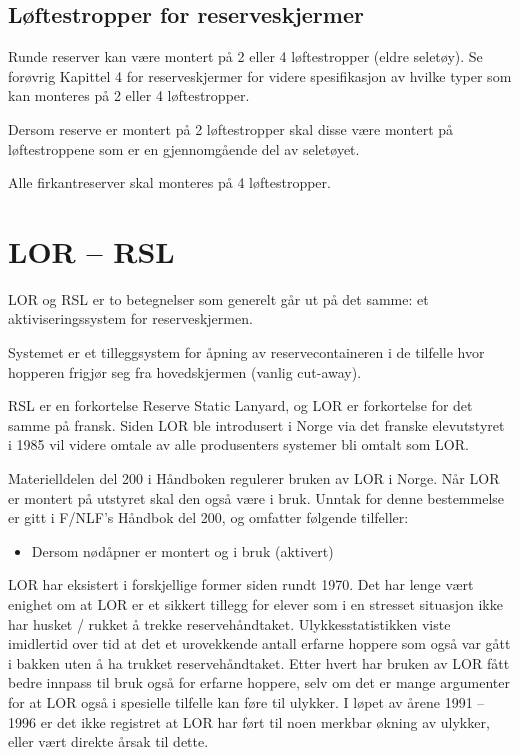 \subsection{Løftestropper for reserveskjermer}
Runde reserver kan være montert på 2 eller 4 løftestropper (eldre seletøy). Se forøvrig Kapittel 4 for reserveskjermer for videre spesifikasjon av hvilke typer som kan monteres på 2 eller 4 løftestropper.

Dersom reserve er montert på 2 løftestropper skal disse være montert på løftestroppene som er en gjennomgående del av seletøyet.

Alle firkantreserver skal monteres på 4 løftestropper.

\section{LOR – RSL}
LOR og RSL er to betegnelser som generelt går ut på det samme: et aktiviseringssystem for reserveskjermen.

Systemet er et tilleggsystem for åpning av reservecontaineren i de tilfelle hvor hopperen frigjør seg fra hovedskjermen (vanlig cut-away).

RSL er en forkortelse Reserve Static Lanyard, og LOR er forkortelse for det samme på fransk. Siden LOR ble introdusert i Norge via det franske elevutstyret i 1985 vil videre omtale av alle produsenters systemer bli omtalt som LOR.

Materielldelen del 200 i Håndboken regulerer bruken av LOR i Norge. Når LOR er montert på utstyret skal den også være i bruk. Unntak for denne bestemmelse er gitt i F/NLF’s Håndbok del 200, og omfatter følgende tilfeller:
\begin{itemize}
\item Dersom nødåpner er montert og i bruk (aktivert)
\end{itemize}

LOR har eksistert i forskjellige former siden rundt 1970. Det har lenge vært enighet om at LOR er et sikkert tillegg for elever som i en stresset situasjon ikke har husket / rukket å trekke reservehåndtaket. Ulykkesstatistikken viste imidlertid over tid at det et urovekkende antall erfarne hoppere som også var gått i bakken uten å ha trukket reservehåndtaket. Etter hvert har bruken av LOR fått bedre innpass til bruk også for erfarne hoppere, selv om det er mange argumenter for at LOR også i spesielle tilfelle kan føre til ulykker. I løpet av årene 1991 – 1996 er det ikke registret at LOR har ført til noen merkbar økning av ulykker, eller vært direkte årsak til dette.

